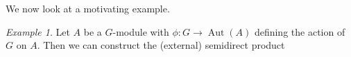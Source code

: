 \documentclass{dcthesis}
\newcommand{\defi}[1]{\textsf{#1}}
\newcommand{\wt}[1]{\widetilde{#1}}
\DeclareMathOperator{\Aut}{Aut}
\theoremstyle{definition}
\newtheorem{definition}[prop]{Definition}
\theoremstyle{remark}
\newtheorem{example}[prop]{Example}
\numberwithin{equation}{section}
\numberwithin{figure}{section}
\begin{document}
{{    %
    We now look at a motivating example.
    \begin{example}
      \label{exm:semidirectproduct}
      Let $A$ be a $G$-module
      with $\phi\colon G\to\Aut(A)$
      defining the action of $G$ on $A$.
      Then we can construct
      the \defi{(external) semidirect product}

\end{example}}}
\end{document}

